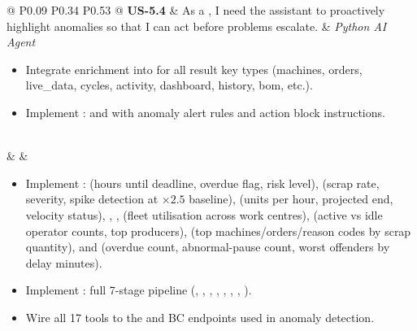 \begin{longtable}{@{} P{0.09\linewidth} P{0.34\linewidth} P{0.53\linewidth} @{}}
	\textbf{US-5.4}
	& As a , I need the assistant to proactively highlight
	anomalies so that I can act before problems escalate.
	& \noindent\textit{Python AI Agent}
	\begin{itemize}[nosep, leftmargin=*]
		\item Integrate enrichment into  for all
		      result key types (machines, orders, live\_data, cycles, activity,
		      dashboard, history, bom, etc.).
		\item Implement :
		       and 
		      with anomaly alert rules and action block instructions.
	\end{itemize}
	\\ & &
	\begin{itemize}[nosep, leftmargin=*]
		\item Implement :
               (hours until deadline, overdue flag,
              risk level),  (scrap rate, severity,
              spike detection at $\times 2.5$ baseline), 
              (units per hour, projected end, velocity status),
              , ,
               (fleet utilisation
              across work centres), 
              (active vs idle operator counts, top producers),
               (top machines/orders/reason
              codes by scrap quantity), and 
              (overdue count, abnormal-pause count, worst offenders by delay
              minutes).
		\item Implement : full 7-stage pipeline
				(, ,
				, ,
				, ,
				, ).
		\item Wire all 17 tools to the  and
		       BC endpoints used in anomaly detection.
	\end{itemize}\\

\end{longtable}

